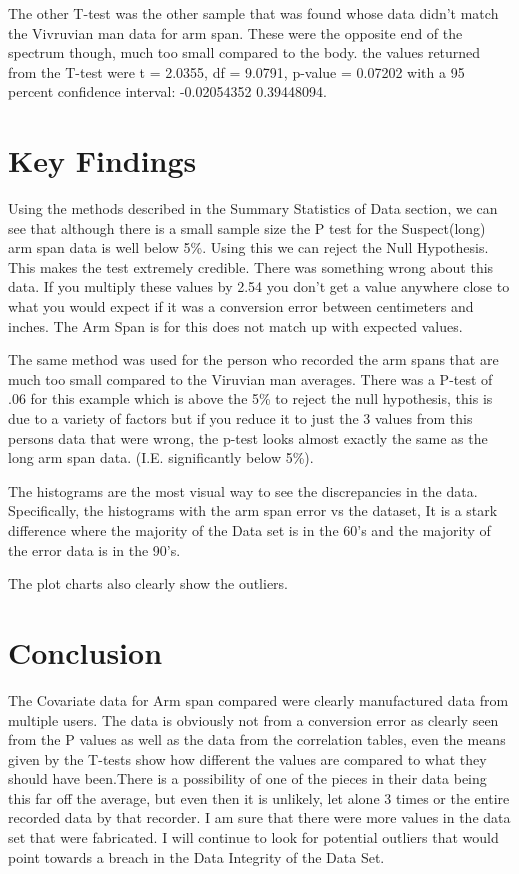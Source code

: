 \documentclass[]{article}
\begin{document}
The other T-test was the other sample that was found whose data didn't
match the Vivruvian man data for arm span. These were the opposite end
of the spectrum though, much too small compared to the body. the values
returned from the T-test were t = 2.0355, df = 9.0791, p-value = 0.07202
with a 95 percent confidence interval: -0.02054352 0.39448094.

\label{sec:data-summary}

\section{Key Findings}

Using the methods described in the Summary Statistics of Data section,
we can see that although there is a small sample size the P test for the
Suspect(long) arm span data is well below 5\%. Using this we can reject
the Null Hypothesis. This makes the test extremely credible. There was
something wrong about this data. If you multiply these values by 2.54
you don't get a value anywhere close to what you would expect if it was
a conversion error between centimeters and inches. The Arm Span is for
this does not match up with expected values.

The same method was used for the person who recorded the arm spans that
are much too small compared to the Viruvian man averages. There was a
P-test of .06 for this example which is above the 5\% to reject the null
hypothesis, this is due to a variety of factors but if you reduce it to
just the 3 values from this persons data that were wrong, the p-test
looks almost exactly the same as the long arm span data. (I.E.
significantly below 5\%).

The histograms are the most visual way to see the discrepancies in the
data. Specifically, the histograms with the arm span error vs the
dataset, It is a stark difference where the majority of the Data set is
in the 60's and the majority of the error data is in the 90's.

The plot charts also clearly show the outliers.

\label{sec:findings}

\section{Conclusion}

The Covariate data for Arm span compared were clearly manufactured data
from multiple users. The data is obviously not from a conversion error
as clearly seen from the P values as well as the data from the
correlation tables, even the means given by the T-tests show how
different the values are compared to what they should have been.There is
a possibility of one of the pieces in their data being this far off the
average, but even then it is unlikely, let alone 3 times or the entire
recorded data by that recorder. I am sure that there were more values in
the data set that were fabricated. I will continue to look for potential
outliers that would point towards a breach in the Data Integrity of the
Data Set. \label{sec:conclusion}
\end{document}
